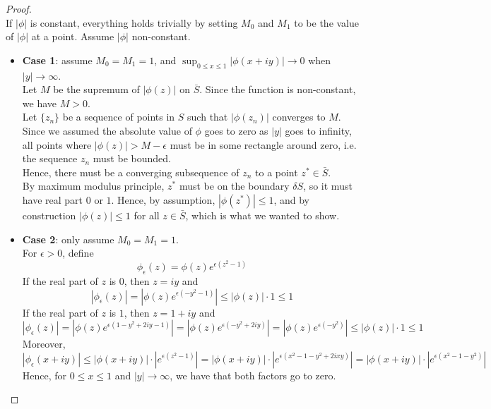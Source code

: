 \begin{proof}
    \leanok %
    ~\\
    If $|\phi|$ is constant, everything holds trivially by setting $M_0$ and $M_1$ to be the value of $|\phi|$ at a point. Assume $|\phi|$ non-constant.\\
    \begin{itemize}
        \item{ \textbf{Case 1}: assume $M_0=M_1=1$, and $\sup_{0 \leq x \leq 1} | \phi(x+iy) | \to 0$ when $|y| \to \infty$.\\
        Let $M$ be the supremum of $|\phi(z)|$ on $\bar{S}$. Since the function is non-constant, we have $M>0$.\\
        Let $\{z_n\}$ be a sequence of points in $S$ such that $|\phi(z_n)|$ converges to $M$.\\
        Since we assumed the absolute value of $\phi$ goes to zero as $|y|$ goes to infinity, all points where $|\phi(z)|>M-\epsilon$ must be in some rectangle around zero, i.e. the sequence ${z_n}$ must be bounded.\\
        Hence, there must be a converging subsequence of ${z_n}$ to a point $z^* \in \bar{S}$.\\
        By maximum modulus principle, $z^*$ must be on the boundary $\delta S$, so it must have real part $0$ or $1$.
        Hence, by assumption, $|\phi(z^*)|\leq 1$, and by construction $|\phi(z)|\leq 1$ for all $z \in \bar{S}$, which is what we wanted to show.
        }
        \item{ \textbf{Case 2}: only assume $M_0 = M_1 = 1$.\\
        For $\epsilon>0$, define
        \[ \phi_{\epsilon} (z) = \phi(z) e^{\epsilon (z^2 - 1)} \]
        If the real part of $z$ is $0$, then $z=iy$ and
        \[ | \phi_{\epsilon} (z) | = |\phi(z) e^{\epsilon (-y^2-1)}| \leq |\phi(z)| \cdot 1 \leq 1\]
        If the real part of $z$ is $1$, then $z=1+iy$ and
        \[ | \phi_{\epsilon} (z) | = |\phi(z) e^{\epsilon (1 -y^2 + 2iy -1)}| = |\phi(z) e^{\epsilon (-y^2 + 2iy)}| = |\phi(z) e^{\epsilon (-y^2)}| \leq |\phi(z)| \cdot 1 \leq 1 \]
        Moreover,
        \[ | \phi_{\epsilon} (x+iy)| \leq |\phi(x+iy)| \cdot |e^{\epsilon(z^2-1)}| = |\phi(x+iy)| \cdot |e^{\epsilon(x^2-1-y^2+2ixy)}| = |\phi(x+iy)| \cdot |e^{\epsilon(x^2-1-y^2)}| \]
        Hence, for $0\leq x \leq 1$ and $|y| \to \infty$, we have that both factors go to zero.\\
}
\end{itemize}
\end{proof}
